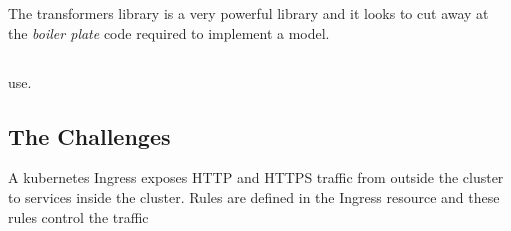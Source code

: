 The transformers library is a very powerful library and it looks to cut away at the \emph{boiler plate} code required to implement a model.

\subsection{}
use.



\subsection{The Challenges}
\label{sec:challenges}
A kubernetes Ingress exposes HTTP and HTTPS traffic
from outside the cluster to services inside the cluster. Rules are defined in the Ingress resource and these rules control the
traffic
